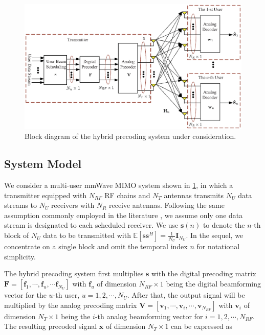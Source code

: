 \documentclass[10pt,journal,twocolumn,twoside]{IEEEtran}
\begin{document}
\begin{figure}[ht]
	\begin{center}
		\includegraphics[scale=0.6]{Figure/SystemSchematic_new.eps}
		\caption{Block diagram of the hybrid precoding system under consideration.}\label{fig:BlockDiagram}
	\end{center}
\end{figure}

\subsection{System Model}

We consider a multi-user mmWave MIMO system shown in \figurename{ \ref{fig:BlockDiagram}}, in which a transmitter equipped with $N_{RF}$ RF chains and $N_T$ antennas transmits $N_U$ data streams to $N_U$ receivers with $N_R$ receive antennas. Following the same assumption commonly employed in the literature \cite{alkhateeb2015limited}, we assume only one data stream is designated to each scheduled receiver. We use ${\bm s}(n)$ to denote the $n$-th block of $N_U$ data to be transmitted with $\mathbb{E}\left[\bm{ss}^H\right]=\frac{1}{N_U}\bm{I}_{N_U}$. In the sequel, we concentrate on a single block and omit the temporal index $n$ for notational simplicity.


The hybrid precoding system first multiplies ${\bm s}$ with the digital precoding matrix $\bm{F}=\left[{\bm f}_1,\cdots,{\bm f}_u,\cdots{\bm f}_{N_U}\right]$ with ${\bm f}_u$ of dimension $N_{RF}\times 1$ being the digital beamforming vector for the $u$-th user, $u=1,2,\cdots,N_U$. After that, the output signal will be multiplied by the analog precoding matrix $\bm{V}=\left[{\bm v}_1,\cdots,{\bm v}_i,\cdots,{\bm v}_{N_{RF}}\right]$ with ${\bm v}_i$ of dimension $N_T\times 1$ being the $i$-th analog beamforming vector for $i=1,2,\cdots,N_{RF}$. The resulting precoded signal $\bm x$ of dimension $N_T\times 1$  can be expressed as
\end{document}
